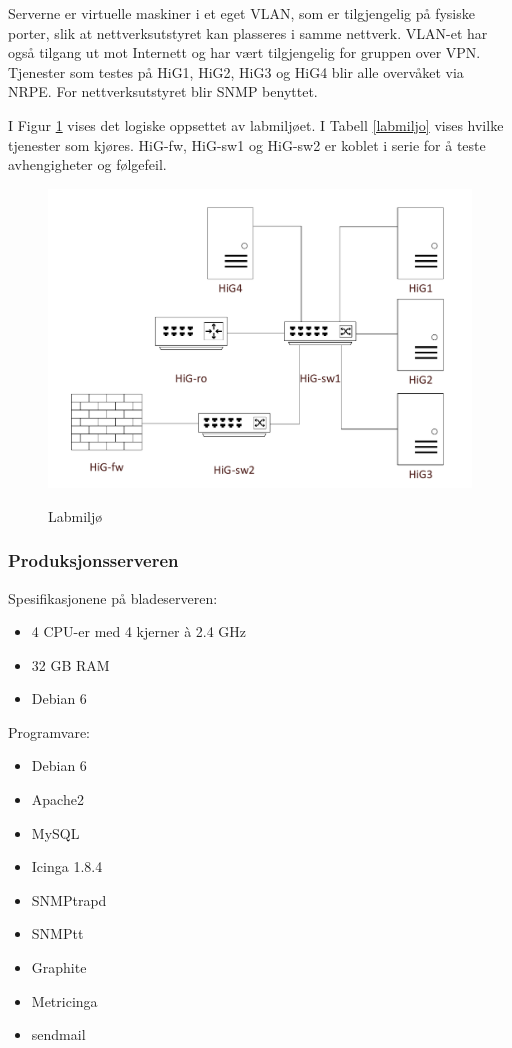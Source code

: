 Serverne er virtuelle maskiner i et eget VLAN, som er tilgjengelig på fysiske porter, slik at nettverksutstyret kan plasseres i samme nettverk. VLAN-et har også tilgang ut mot Internett og har vært tilgjengelig for gruppen over VPN. Tjenester som testes på HiG1, HiG2, HiG3 og HiG4 blir alle overvåket via NRPE. For nettverksutstyret blir SNMP benyttet.

I Figur \ref{laboppsett} vises det logiske oppsettet av labmiljøet. I Tabell \ref{labmiljo} vises hvilke tjenester som kjøres. HiG-fw, HiG-sw1 og HiG-sw2 er koblet i serie for å teste avhengigheter og følgefeil.

\begin{figure}[H]
    \centering
    \includegraphics[scale=0.4]{img/labmiljo}
	\label{laboppsett}
    \caption{Labmiljø}
\end{figure}


\subsubsection{Produksjonsserveren}
Spesifikasjonene på bladeserveren:
\begin{itemize}
\item 4 CPU-er med 4 kjerner à 2.4 GHz
\item 32 GB RAM
\item Debian 6
\end{itemize}
Programvare:
\begin{itemize}
\item Debian 6
\item Apache2
\item MySQL
\item Icinga 1.8.4
\item SNMPtrapd
\item SNMPtt
\item Graphite
\item Metricinga 
\item sendmail
\end{itemize}

